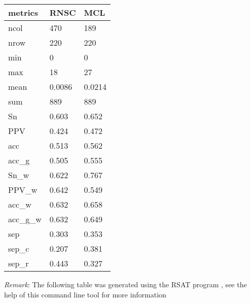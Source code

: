 \begin{tabular}{|l|l|l|}
\hline
metrics & RNSC & MCL \\ \hline
ncol & 470 & 189 \\ \hline
nrow & 220 & 220 \\ \hline
min & 0 & 0 \\ \hline
max & 18 & 27 \\ \hline
mean & 0.0086 & 0.0214 \\ \hline
sum & 889 & 889 \\ \hline
Sn & 0.603 & 0.652 \\ \hline
PPV & 0.424 & 0.472 \\ \hline
acc & 0.513 & 0.562 \\ \hline
acc\_g & 0.505 & 0.555 \\ \hline
Sn\_w & 0.622 & 0.767 \\ \hline
PPV\_w & 0.642 & 0.549 \\ \hline
acc\_w & 0.632 & 0.658 \\ \hline
acc\_g\_w & 0.632 & 0.649 \\ \hline
sep & 0.303 & 0.353 \\ \hline
sep\_c & 0.207 & 0.381 \\ \hline
sep\_r & 0.443 & 0.327 \\ \hline

\end{tabular}

\textit{Remark}: The following table was generated using the RSAT program , see the help of this command line tool for more information